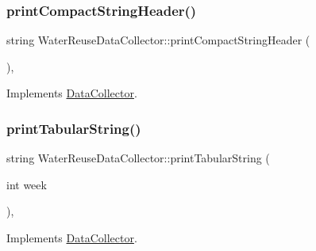 \subsubsection{\texorpdfstring{print\+Compact\+String\+Header()}{printCompactStringHeader()}}
{\footnotesize\ttfamily string Water\+Reuse\+Data\+Collector\+::print\+Compact\+String\+Header (\begin{DoxyParamCaption}{ }\end{DoxyParamCaption})\hspace{0.3cm}{\ttfamily [override]}, {\ttfamily [virtual]}}



Implements \mbox{\hyperlink{classDataCollector_a98dcb4ec871d9c7fbf7545c64e5ccc67_a98dcb4ec871d9c7fbf7545c64e5ccc67}{Data\+Collector}}.

\mbox{\label{classWaterReuseDataCollector_af8b637ad080f354dc145f11580834da8_af8b637ad080f354dc145f11580834da8}} 
\subsubsection{\texorpdfstring{print\+Tabular\+String()}{printTabularString()}}
{\footnotesize\ttfamily string Water\+Reuse\+Data\+Collector\+::print\+Tabular\+String (\begin{DoxyParamCaption}\item[{int}]{week }\end{DoxyParamCaption})\hspace{0.3cm}{\ttfamily [override]}, {\ttfamily [virtual]}}



Implements \mbox{\hyperlink{classDataCollector_a397fccabe0223267eea8fc7cac0e59da_a397fccabe0223267eea8fc7cac0e59da}{Data\+Collector}}.

\mbox{\label{classWaterReuseDataCollector_a1065ad3627b913dccb6ecbf0e6acc6e6_a1065ad3627b913dccb6ecbf0e6acc6e6}} 
